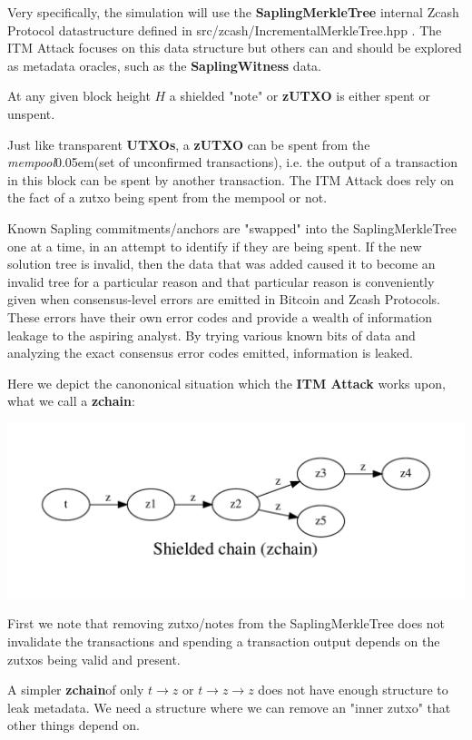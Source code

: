 \documentclass{article}
\newcommand{\term}[1]{\textsl{#1}\kern 0.05em\xspace}
\newcommand{\mempool}{\term{mempool}}
\newcommand{\zchain}{\textbf{zchain}}
\newcommand{\ITM}{\textbf{ITM Attack} }
\begin{document}
Very specifically, the simulation will use the \textbf{SaplingMerkleTree} internal Zcash Protocol datastructure defined in src/zcash/IncrementalMerkleTree.hpp . The ITM Attack focuses on this data structure but others can and should be explored as metadata oracles, such as the \textbf{SaplingWitness} data.

At any given block height $H$ a shielded "note" or \textbf{zUTXO} is either spent or unspent.

Just like transparent \textbf{UTXOs}, a \textbf{zUTXO} can be spent from the \mempool (set of unconfirmed transactions), i.e. the output of a transaction in this block can be spent by another transaction. The ITM Attack does rely on the fact of a zutxo being spent from the mempool or not.

Known Sapling commitments/anchors are "swapped" into the SaplingMerkleTree one at a time,
in an attempt to identify if they are being spent. If the new solution tree is invalid, then the data that was added caused it to become an invalid tree for a particular reason and
that particular reason is conveniently given when consensus-level errors are emitted in Bitcoin and Zcash Protocols. These errors have their own error codes and provide a wealth of information leakage to the aspiring analyst. By trying various known bits of data and analyzing the exact consensus error codes emitted, information is leaked.

Here we depict the canononical situation which the \ITM works upon, what we call a \zchain :

\includegraphics[scale=0.9]{itm-zchain.pdf}

First we note that removing zutxo/notes from the SaplingMerkleTree does not invalidate the transactions and 
spending a transaction output depends on the zutxos being valid and present.

A simpler \zchain of only $ t \rightarrow z $ or $ t \rightarrow z \rightarrow z $ does not have enough structure to leak metadata. We need
a structure where we can remove an "inner zutxo" that other things depend on.
\end{document}
